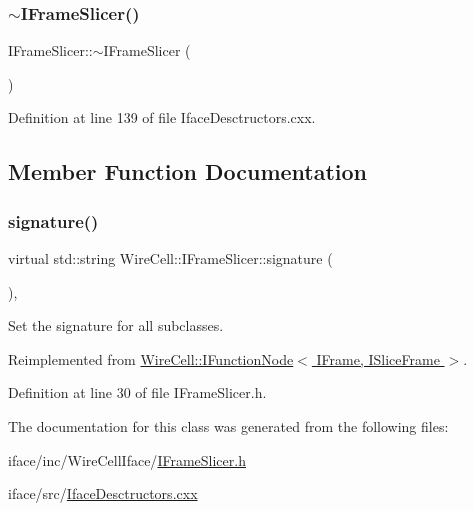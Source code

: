 \subsubsection{\texorpdfstring{$\sim$\+I\+Frame\+Slicer()}{~IFrameSlicer()}}
{\footnotesize\ttfamily I\+Frame\+Slicer\+::$\sim$\+I\+Frame\+Slicer (\begin{DoxyParamCaption}{ }\end{DoxyParamCaption})\hspace{0.3cm}{\ttfamily [virtual]}}



Definition at line 139 of file Iface\+Desctructors.\+cxx.



\subsection{Member Function Documentation}
\mbox{\label{class_wire_cell_1_1_i_frame_slicer_a1af9b9d4cc6a0925925a5d7de316e730}} 
\subsubsection{\texorpdfstring{signature()}{signature()}}
{\footnotesize\ttfamily virtual std\+::string Wire\+Cell\+::\+I\+Frame\+Slicer\+::signature (\begin{DoxyParamCaption}{ }\end{DoxyParamCaption})\hspace{0.3cm}{\ttfamily [inline]}, {\ttfamily [virtual]}}



Set the signature for all subclasses. 



Reimplemented from \hyperlink{class_wire_cell_1_1_i_function_node_af59f46cf19ca9fdf4aade1f289feedf2}{Wire\+Cell\+::\+I\+Function\+Node$<$ I\+Frame, I\+Slice\+Frame $>$}.



Definition at line 30 of file I\+Frame\+Slicer.\+h.



The documentation for this class was generated from the following files\+:\begin{DoxyCompactItemize}
\item 
iface/inc/\+Wire\+Cell\+Iface/\hyperlink{_i_frame_slicer_8h}{I\+Frame\+Slicer.\+h}\item 
iface/src/\hyperlink{_iface_desctructors_8cxx}{Iface\+Desctructors.\+cxx}\end{DoxyCompactItemize}
